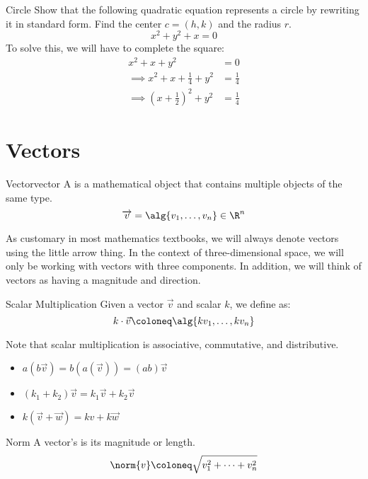 \documentclass[math]{amznotes}
\begin{document}
\begin{exbox}{Circle}{}
    Show that the following quadratic equation represents a circle by rewriting it in standard form. Find the center $c = (h,k)$ and the radius $r$.
    \[ x^2 + y^2 + x = 0 \]
    \tcblower
    To solve this, we will have to complete the square:
    \begin{align*}
        x^2 + x + y^2 &= 0 \\
        \implies x^2 + x + \frac{1}{4} + y^2 &= \frac{1}{4} \\
        \implies \left( x + \frac12 \right)^2 + y^2 &= \frac14
    \end{align*}
\end{exbox}

\section{Vectors}

\begin{dfnbox}{Vector}{vector}
    A  is a mathematical object that contains multiple objects of the same type.
    \tcblower
    \[ \overrightarrow{v} = \alg{v_1, \ldots, v_n} \in \R^n \]
\end{dfnbox}

As customary in most mathematics textbooks, we will always denote vectors using the little arrow thing. In the context of three-dimensional space, we will only be working with vectors with three components. In addition, we will think of vectors as having a magnitude and direction.

\begin{dfnbox}{Scalar Multiplication}{}
    Given a vector $\vec{v}$ and scalar $k$, we define  as:
    \[ k \cdot \vec{v} \coloneq \alg{kv_1, \ldots, kv_n} \]
\end{dfnbox}

Note that scalar multiplication is associative, commutative, and distributive.
\begin{itemize}
    \item $a(b\vec{v}) = b(a(\vec{v})) = (ab) \vec{v}$
    \item $(k_1 + k_2) \vec{v} = k_1 \vec{v} + k_2 \vec{v}$
    \item $k (\vec{v} + \vec{w}) = k{v} + k\vec{w}$
\end{itemize}

\begin{dfnbox}{Norm}{}
    A vector's  is its magnitude or length.
    \tcblower
    \[ \norm{v} \coloneq \sqrt{v_1^2 + \cdots + v_n^2} \]
\end{dfnbox}
\end{document}
